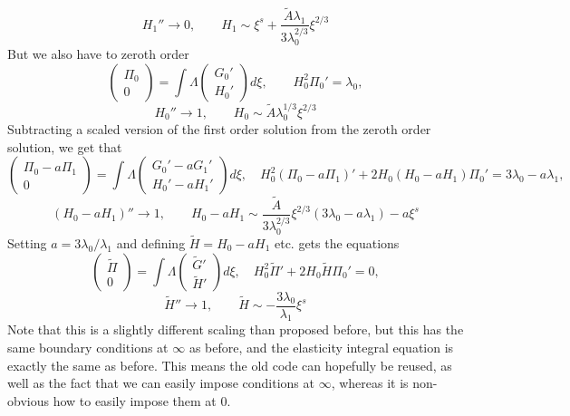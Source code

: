 \documentclass{article}
\begin{document}
\[ H_1'' \to 0, \qquad H_1 \sim \xi^s + \frac{\tilde{A} \lambda_1}{3 
\lambda_0^{2/3}} \xi^{2/3} \]
But we also have to zeroth order
\[ \left( \begin{array}{c} \Pi_0 \\ 0 \end{array} \right)
= \int \Lambda 
 \left( \begin{array}{c} G_0' \\ H_0' \end{array} \right) d\xi, \qquad
H_0^2 \Pi_0' = \lambda_0, \] 
\[ H_0'' \to 1, \qquad H_0 \sim \tilde{A} \lambda_0^{1/3} \xi^{2/3} \]
Subtracting a scaled version of the first order solution from the zeroth
order solution, we get that
\[ \left( \begin{array}{c} \Pi_0 - a \Pi_1 \\ 0 \end{array} \right)
= \int \Lambda 
 \left( \begin{array}{c} G_0'- aG_1' \\ H_0'-aH_1' \end{array} \right) d\xi, 
\quad H_0^2 (\Pi_0-a\Pi_1)'+2H_0(H_0 - a H_1)\Pi_0' = 3\lambda_0 - 
a \lambda_1, \] 
\[ (H_0-aH_1)'' \to 1, \qquad H_0 - a H_1 \sim 
\frac{\tilde{A}}{3 \lambda_0^{2/3}} \xi^{2/3}(3\lambda_0 - a\lambda_1) 
- a \xi^s\]
Setting $a = 3\lambda_0/\lambda_1$ and defining $\tilde{H} = 
H_0 - a H_1$ etc. gets the equations 
\[ \left( \begin{array}{c} \tilde{\Pi} \\ 0 \end{array} \right)
= \int \Lambda 
 \left( \begin{array}{c} \tilde{G}' \\ \tilde{H}' \end{array} \right) d\xi, 
\quad H_0^2 \tilde{\Pi}'+2H_0\tilde{H}\Pi_0' = 0, \] 
\[ \tilde{H}'' \to 1, \qquad \tilde{H} \sim - \frac{3\lambda_0}{\lambda_1} 
\xi^s \]
Note that this is a slightly different scaling than proposed before, but 
this has the same boundary conditions at $\infty$ as before, and
the elasticity integral equation is exactly the same as before. This means
the old code can hopefully be reused, as well as the fact that we can easily
impose conditions at $\infty$, whereas it is non-obvious how to easily impose 
them at 0.
\end{document}

